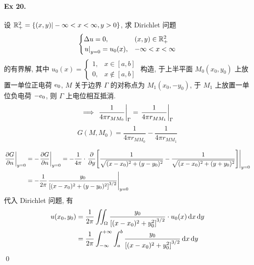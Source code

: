 \paragraph{Ex 20.}
设 ${\mathbb R}^2_{+} = {\left\{ {(x, y)|-\infty<x<\infty, y>0} \right\}}$, 求 Dirichlet
问题
\[\begin{cases}
\Delta u = 0, & (x, y) \in {\mathbb R}^2_{+} \\
{\left.{u} \right|}_{y=0} = u_0(x), & -\infty < x < \infty
\end{cases} \]
的有界解, 其中
$u_0(x) = \begin{cases}1, & x\in[a, b] \\ 0, & x \notin[a, b]\end{cases}$
\solution
构造, 于上半平面 $M_0(x_0, y_0)$ 上放置一单位正电荷 ${\mathrm e}_0$, $M$ 关于边界
$\Gamma$ 的对称点为 $M_1(x_0, -y_0)$, 于 $M_1$ 上放置一单位负电荷 $-{\mathrm e}_0$,
则 $\Gamma$ 上电位相互抵消.
\[ \implies {\left.{\frac 1{4\pi r_{MM_0}}} \right|}_{\Gamma} =
{\left.{\frac 1{4\pi r_{MM_1}}} \right|}_{\Gamma} \]
\[ G(M, M_0) = \frac 1{4\pi r_{MM_0}} - \frac 1{4\pi r_{MM_1}} \]

\[ \begin{aligned}
{\left.{{\frac{\partial {G}}{\partial {n}}}} \right|}_{y=0} &= -{\left.{{\frac{\partial {G}}{\partial {n}}}} \right|}_{y=0}
= -\frac 1{4\pi} \cdot {\left.{{{\frac{\partial {}}{\partial {y}}}} {\left[ {
\frac 1{\sqrt{(x-x_0)^2 + (y-y_0)^2}} - \frac 1{\sqrt{(x-x_0)^2 + (y+y_0)^2}}
} \right]}} \right|}_{y=0} \\
&= -\frac 1{2\pi} {\left.{\frac{y_0}{{\left[ {
	(x-x_0)^2+(y-y_0)^2
} \right]}^{3/2}}} \right|}_{y=0}
\end{aligned} \]
代入 Dirichlet 问题, 有
\[ \begin{aligned}
u(x_0, y_0) &= \frac 1{2\pi} \iint_\Omega \frac{y_0}{{\left[ {
	(x-x_0)^2+y_0^2
} \right]}^{3/2}} \cdot u_0(x) \operatorname{d\!} x \operatorname{d\!} y \\
&= \frac 1{2\pi} \int_{-\infty}^{+\infty} \int_a^b \frac{y_0}{{\left[ {
	(x-x_0)^2+y_0^2
} \right]}^{3/2}}  \operatorname{d\!} x \operatorname{d\!} y \\
\end{aligned} \]
\qed
\endinput
